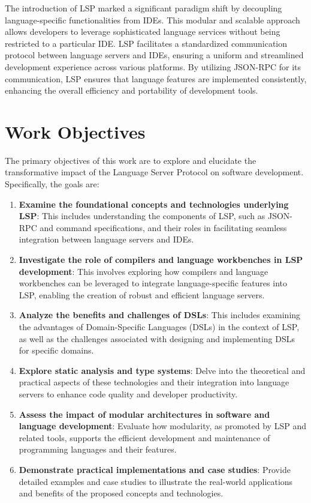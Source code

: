 \documentclass{adapt-lab}
\begin{document}
The introduction of LSP marked a significant paradigm shift by decoupling language-specific functionalities from IDEs. This modular and scalable approach allows developers to leverage sophisticated language services without being restricted to a particular IDE. LSP facilitates a standardized communication protocol between language servers and IDEs, ensuring a uniform and streamlined development experience across various platforms. By utilizing JSON-RPC for its communication, LSP ensures that language features are implemented consistently, enhancing the overall efficiency and portability of development tools.

\section{Work Objectives}

The primary objectives of this work are to explore and elucidate the transformative impact of the Language Server Protocol on software development. Specifically, the goals are:
\begin{enumerate}
    \item \textbf{Examine the foundational concepts and technologies underlying LSP}: This includes understanding the components of LSP, such as JSON-RPC and command specifications, and their roles in facilitating seamless integration between language servers and IDEs.
    \item \textbf{Investigate the role of compilers and language workbenches in LSP development}: This involves exploring how compilers and language workbenches can be leveraged to integrate language-specific features into LSP, enabling the creation of robust and efficient language servers.
    \item \textbf{Analyze the benefits and challenges of DSLs}: This includes examining the advantages of Domain-Specific Languages (DSLs) in the context of LSP, as well as the challenges associated with designing and implementing DSLs for specific domains.
    \item \textbf{Explore static analysis and type systems}: Delve into the theoretical and practical aspects of these technologies and their integration into language servers to enhance code quality and developer productivity.
    \item \textbf{Assess the impact of modular architectures in software and language development}: Evaluate how modularity, as promoted by LSP and related tools, supports the efficient development and maintenance of programming languages and their features.
    \item \textbf{Demonstrate practical implementations and case studies}: Provide detailed examples and case studies to illustrate the real-world applications and benefits of the proposed concepts and technologies.
\end{enumerate}
\end{document}
